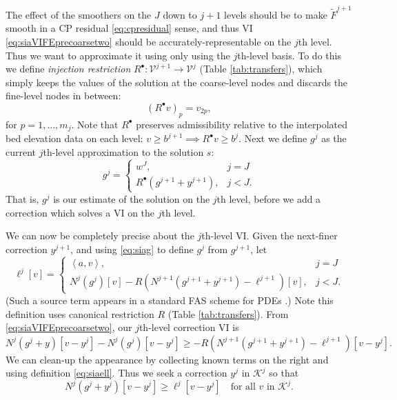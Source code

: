 \documentclass[letterpaper,final,12pt,reqno]{amsart}
\theoremstyle{claim}
\newcommand{\ip}[2]{\left<#1,#2\right>}
\newcommand{\iR}{R^{\bullet}}
\numberwithin{equation}{section}
\numberwithin{figure}{section}
\numberwithin{table}{section}
\numberwithin{theorem}{section}
\begin{document}
The effect of the smoothers on the $J$ down to $j+1$ levels should be to make $\tilde F^{j+1}$ smooth in a CP residual \eqref{eq:cpresidual} sense, and thus VI \eqref{eq:siaVIFEprecoarsetwo} should be accurately-representable on the $j$th level.  Thus we want to approximate it using only using the $j$th-level basis.  To do this we define \emph{injection restriction} $\iR:\mathcal{V}^{j+1} \to \mathcal{V}^j$ (Table \ref{tab:transfers}), which simply keeps the values of the solution at the coarse-level nodes and discards the fine-level nodes in between:
\begin{equation}
  (\iR v)_p = v_{2p}, \label{eq:injectionrestriction}
\end{equation}
for $p=1,\dots,m_j$.  Note that $\iR$ preserves admissibility relative to the interpolated bed elevation data on each level: $v\ge b^{j+1} \implies \iR v \ge b^j$.  Next we define $g^j$ as the current $j$th-level approximation to the solution $s$:
\begin{equation}
g^j = \begin{cases} w^J, & j=J \\
                    \iR(g^{j+1} + y^{j+1}), & j < J.
      \end{cases}  \label{eq:siag}
\end{equation}
That is, $g^j$ is our estimate of the solution on the $j$th level, before we add a correction which solves a VI on the $j$th level.

We can now be completely precise about the $j$th-level VI.  Given the next-finer correction $y^{j+1}$, and using \eqref{eq:siag} to define $g^j$ from $g^{j+1}$, let
\begin{equation}
\ell^j[v] = \begin{cases} \ip{a}{v}, & j=J \\
                          N^j(g^j)[v] - R \left(N^{j+1}(g^{j+1}+y^{j+1}) - \ell^{j+1}\right)[v], & j < J.
            \end{cases}  \label{eq:siaell}
\end{equation}
(Such a source term appears in a standard FAS scheme for PDEs \cite{Trottenbergetal2001}.)  Note this definition uses canonical restriction $R$ (Table \ref{tab:transfers}).  From \eqref{eq:siaVIFEprecoarsetwo}, our $j$th-level correction VI is
\begin{equation}
N^j(g^j+y)[v-y^j] - N^j(g^j)[v-y^j] \ge - R \left(N^{j+1}(g^{j+1}+y^{j+1}) - \ell^{j+1}\right)[v-y^j]. \label{eq:siaVIFEFASearly}
\end{equation}
We can clean-up the appearance by collecting known terms on the right and using definition \eqref{eq:siaell}.  Thus we seek a correction $y^j$ in $\mathcal{K}^j$ so that
\begin{equation}
N^j(g^j+y^j)[v-y^j] \ge \ell^j[v-y^j] \quad \text{for all $v$ in $\mathcal{K}^j$.} \label{eq:siaVIFEFAS}
\end{equation}
\end{document}
